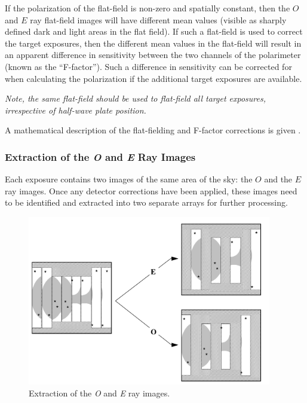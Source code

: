 \documentclass[twoside,11pt]{starlink}
\begin{document}
If the polarization of the flat-field is non-zero and spatially constant,
then the $O$ and $E$ ray flat-field images will have different mean
values (visible as sharply defined dark and light areas in the flat
field). If such a flat-field is used to correct the target exposures,
then the different mean values in the flat-field will result in an
apparent difference in sensitivity between the two channels of the
polarimeter (known as the ``F-factor''). Such a difference in sensitivity
can be corrected for when calculating the polarization if the additional
target exposures  are available.

\emph{Note, the same flat-field should be used to flat-field all target
exposures, irrespective of half-wave plate position.}

A mathematical description of the flat-fielding and F-factor corrections
is given .

\subsubsection{Extraction of the \emph{O} and \emph{E} Ray Images}
Each exposure contains two images of the same area of the sky: the $O$
and the $E$ ray images. Once any detector corrections have been applied,
these images need to be identified and extracted into two separate arrays for
further processing.

  \vspace{5mm}
  \begin{figure}[htbp]
  \begin{center}
  \includegraphics[clip,width=0.95\textwidth]{sun223_figures/extract}
  \caption{Extraction of the \emph{O} and \emph{E} ray images.}
  \label{fig:extract}
  \end{center}
  \end{figure}
\end{document}
